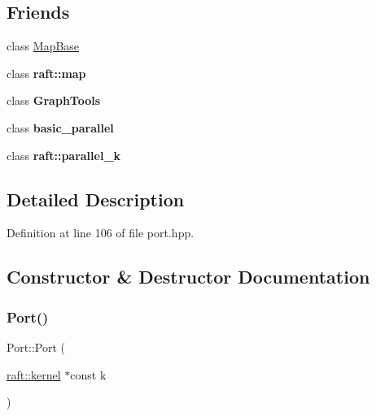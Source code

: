 \subsection*{Friends}
\begin{DoxyCompactItemize}
\item 
class \hyperlink{class_port_aed45534b6a99d5630dcfa9eedbe023fc}{Map\+Base}
\item 
\hypertarget{class_port_aa25a3986fa3c9242f434168844d4ddfb}{}\label{class_port_aa25a3986fa3c9242f434168844d4ddfb} 
class {\bfseries raft\+::map}
\item 
\hypertarget{class_port_a60770fd1bd2e4378b64b8bb78b3af209}{}\label{class_port_a60770fd1bd2e4378b64b8bb78b3af209} 
class {\bfseries Graph\+Tools}
\item 
\hypertarget{class_port_a901ac6fe1c35f3c114cf9e83f75dde0c}{}\label{class_port_a901ac6fe1c35f3c114cf9e83f75dde0c} 
class {\bfseries basic\+\_\+parallel}
\item 
\hypertarget{class_port_abf9ffb5a15eb9623a47ea7e488ae112b}{}\label{class_port_abf9ffb5a15eb9623a47ea7e488ae112b} 
class {\bfseries raft\+::parallel\+\_\+k}
\end{DoxyCompactItemize}


\subsection{Detailed Description}


Definition at line 106 of file port.\+hpp.



\subsection{Constructor \& Destructor Documentation}
\hypertarget{class_port_afa3ede44d69282f75d45e714a590e152}{}\label{class_port_afa3ede44d69282f75d45e714a590e152} 
\subsubsection{\texorpdfstring{Port()}{Port()}\hspace{0.1cm}{\footnotesize\ttfamily [1/2]}}
{\footnotesize\ttfamily Port\+::\+Port (\begin{DoxyParamCaption}\item[{\hyperlink{classraft_1_1kernel}{raft\+::kernel} $\ast$const}]{k }\end{DoxyParamCaption})}

